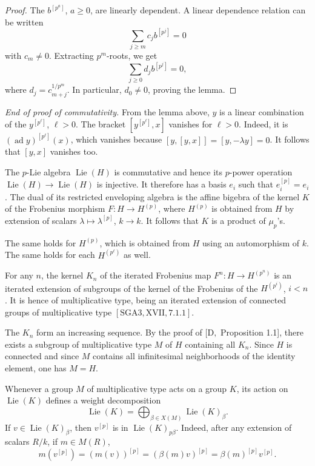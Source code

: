 \documentclass[11pt]{article}
\newcommand{\Lie}{\operatorname{Lie}}
\begin{document}
\begin{proof}
The \(b^{[p^a]}\), \(a\ge0\), are linearly dependent. A linear dependence relation can
be written
\begin{equation}
  \sum_{j\ge m} c_j b^{[p^j]}=0
  \tag{2.9.1}
\end{equation}
with \(c_m\ne0\). Extracting \(p^m\)-roots, we get
\begin{equation}
  \sum_{j\ge0} d_j b^{[p^j]}=0,
  \tag{2.9.2}
\end{equation}
where \(d_j=c_{m+j}^{1/p^m}\). In particular, \(d_0\ne0\), proving the lemma.
\end{proof}

\noindent\emph{End of proof of commutativity.}
From the lemma above, \(y\) is a linear combination of the \(y^{[p^\ell]}\),
\(\ell>0\). The bracket \([y^{[p^\ell]},x]\) vanishes for \(\ell>0\). Indeed, it is
\((\operatorname{ad}y)^{[p^\ell]}(x)\), which vanishes because
\([y,[y,x]]=[y,-\lambda y]=0\). It follows that \([y,x]\) vanishes too.

The \(p\)-Lie algebra \(\Lie(H)\) is commutative and hence its \(p\)-power operation
\(\Lie(H)\to\Lie(H)\) is injective. It therefore has a basis \(e_i\) such that
\(e_i^{[p]}=e_i\). The dual of its restricted enveloping algebra is the affine bigebra
of the kernel \(K\) of the Frobenius morphism \(F:H\to H^{(p)}\), where \(H^{(p)}\)
is obtained from \(H\) by extension of scalars \(\lambda\mapsto\lambda^{[p]}\),
\(k\to k\). It follows that \(K\) is a product of \(\mu_p\)'s.

The same holds for \(H^{(p)}\), which is obtained from \(H\) using an automorphism of
\(k\). The same holds for each \(H^{(p^\ell)}\) as well.

For any \(n\), the kernel \(K_n\) of the iterated Frobenius map
\(F^n:H\to H^{(p^n)}\) is an iterated extension of subgroups of the kernel of the
Frobenius of the \(H^{(p^i)}\), \(i<n\). It is hence of multiplicative type, being an
iterated extension of connected groups of multiplicative type
\([\mathrm{SGA3},\mathrm{XVII},7.1.1]\).

The \(K_n\) form an increasing sequence. By the proof of \([\mathrm D,\) Proposition
1.1], there exists a subgroup of multiplicative type \(M\) of \(H\) containing all
\(K_n\). Since \(H\) is connected and since \(M\) contains all infinitesimal
neighborhoods of the identity element, one has \(M=H\).

Whenever a group \(M\) of multiplicative type acts on a group \(K\), its action on
\(\Lie(K)\) defines a weight decomposition
\begin{equation}
  \Lie(K)=\bigoplus_{\beta\in X(M)} \Lie(K)_\beta .
  \tag{2.9.3}
\end{equation}
If \(v\in \Lie(K)_\beta\), then \(v^{[p]}\) is in \(\Lie(K)_{p\beta}\). Indeed, after
any extension of scalars \(R/k\), if \(m\in M(R)\),
\begin{equation}
  m(v^{[p]})=(m(v))^{[p]}=(\beta(m)v)^{[p]}=\beta(m)^{[p]}v^{[p]}.
  \tag{2.9.4}
\end{equation}
\end{document}
